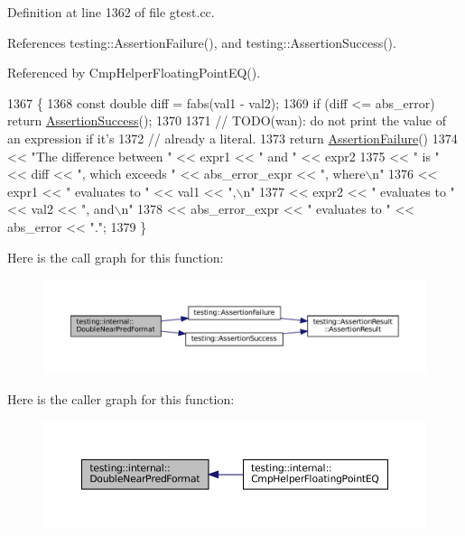 Definition at line 1362 of file gtest.\+cc.



References testing\+::\+Assertion\+Failure(), and testing\+::\+Assertion\+Success().



Referenced by Cmp\+Helper\+Floating\+Point\+E\+Q().


\begin{DoxyCode}
1367                                                        \{
1368   \textcolor{keyword}{const} \textcolor{keywordtype}{double} diff = fabs(val1 - val2);
1369   \textcolor{keywordflow}{if} (diff <= abs\_error) \textcolor{keywordflow}{return} \hyperlink{namespacetesting_ac1d0baedb17286c5c6c87bd1a45da8ac}{AssertionSuccess}();
1370 
1371   \textcolor{comment}{// TODO(wan): do not print the value of an expression if it's}
1372   \textcolor{comment}{// already a literal.}
1373   \textcolor{keywordflow}{return} \hyperlink{namespacetesting_a75cb789614cb1c28c34627a4a3c053df}{AssertionFailure}()
1374       << \textcolor{stringliteral}{"The difference between "} << expr1 << \textcolor{stringliteral}{" and "} << expr2
1375       << \textcolor{stringliteral}{" is "} << diff << \textcolor{stringliteral}{", which exceeds "} << abs\_error\_expr << \textcolor{stringliteral}{", where\(\backslash\)n"}
1376       << expr1 << \textcolor{stringliteral}{" evaluates to "} << val1 << \textcolor{stringliteral}{",\(\backslash\)n"}
1377       << expr2 << \textcolor{stringliteral}{" evaluates to "} << val2 << \textcolor{stringliteral}{", and\(\backslash\)n"}
1378       << abs\_error\_expr << \textcolor{stringliteral}{" evaluates to "} << abs\_error << \textcolor{stringliteral}{"."};
1379 \}
\end{DoxyCode}
Here is the call graph for this function\+:
\nopagebreak
\begin{figure}[H]
\begin{center}
\leavevmode
\includegraphics[width=350pt]{namespacetesting_1_1internal_a4f70b36c624b54c2362aeecc2f05ee8c_cgraph}
\end{center}
\end{figure}
Here is the caller graph for this function\+:
\nopagebreak
\begin{figure}[H]
\begin{center}
\leavevmode
\includegraphics[width=350pt]{namespacetesting_1_1internal_a4f70b36c624b54c2362aeecc2f05ee8c_icgraph}
\end{center}
\end{figure}
